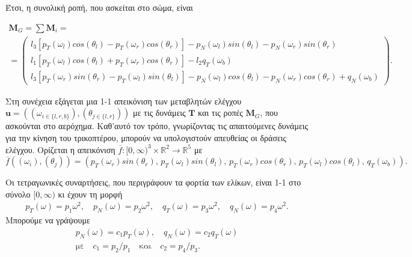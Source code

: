 \noindent Έτσι, η συνολική ροπή, που ασκείται στο σώμα, είναι

\begin{gather*}
    \mathbf{M}_G = \sum \mathbf{M}_i = \\
    =\begin{pmatrix}
        {l_3[p_T(\omega_l)cos(\theta_l)- p_T(\omega_r)cos(\theta_r)]
        - p_N(\omega_l)sin(\theta_l) - p_N(\omega_r)sin(\theta_r)} \\[3pt]
        l_1[p_T(\omega_l)cos(\theta_l)+p_T(\omega_r)cos(\theta_r)]
        -l_2 q_T(\omega_b)                                        \\[3pt]
        l_3[p_T(\omega_r)sin(\theta_r)-p_T(\omega_l)sin(\theta_l)]
        - p_N(\omega_l)cos(\theta_l) - p_N(\omega_r)cos(\theta_r) +q_N(\omega_b)
    \end{pmatrix}.
\end{gather*}

Στη συνέχεια εξάγεται μια 1-1 απεικόνιση των μεταβλητών ελέγχου
$\mathbf{u}\! =\! \left(\left(\omega_{i\in \{l, r, b\}}\right),\left(\theta_{j
\in \{l, r\}}\right)\right)$ με τις δυνάμεις $\mathbf{T}$ και τις ροπές $
\mathbf{M}_G$, που ασκούνται στο αερόχημα. Καθ'αυτό τον τρόπο, γνωρίζοντας τις 
απαιτούμενες δυνάμεις για την κίνηση του τρικοπτέρου, μπορούν να υπολογιστούν 
απευθείας οι δράσεις ελέγχου. Ορίζεται η απεικόνιση
$\overline{f}: [0, \infty)^3\times \mathbb{R}^2\rightarrow \mathbb{R}^5$ με
\begin{equation*}
    \overline{f}
    \left( (\omega_i),(\theta_j) \right) =
    \left(
    p_T(\omega_r)sin(\theta_r),\,
    p_T(\omega_l)sin(\theta_l),\,
    p_T(\omega_r)cos(\theta_r),\,
    p_T(\omega_l)cos(\theta_l),\,
    q_T(\omega_b)
    \right).
\end{equation*}

Οι τετραγωνικές συναρτήσεις, που περιγράφουν τα φορτία των ελίκων, είναι 1-1 στο 
σύνολο $[0,\infty)$ κι έχουν τη μορφή 
\begin{gather*}
    p_T(\omega) = p_1 \omega^2,\quad p_N(\omega) = p_2 \omega^2,\quad
    q_T(\omega) = p_3 \omega^2,\quad q_N(\omega) = p_4 \omega^2.
\end{gather*}
Μπορούμε να γράψουμε
\begin{gather*}
    p_N(\omega) = c_1 p_T(\omega),\quad q_N(\omega) = c_2 q_T(\omega)\\
    \text{με}\quad c_1 = p_2 / p_1\quad \text{και}\quad c_2 = p_4 / p_3.
\end{gather*}

